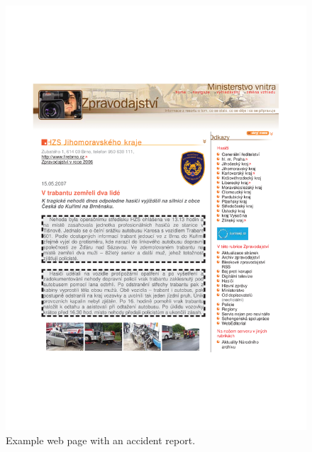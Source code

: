 \begin{figure}[t!]
	\centering
		\includegraphics[width=0.8\hsize]{article}
	\caption{Example web page with an accident report.}
	\label{fig:manual_article}
\end{figure}




